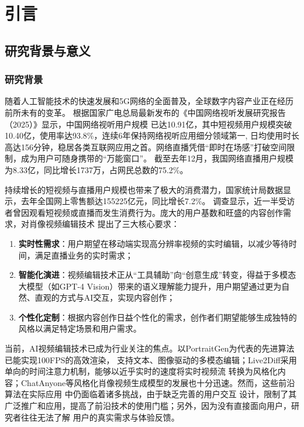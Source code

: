 
\chapter{引言}

\section{研究背景与意义}

\subsection{研究背景}

随着人工智能技术的快速发展和5G网络的全面普及，全球数字内容产业正在经历前所未有的变革。
根据国家广电总局最新发布的《中国网络视听发展研究报告（2025）》显示，中国网络视听用户规模
已达10.91亿，其中短视频用户规模突破10.40亿，使用率达93.8\%，连续6年保持网络视听应用细分领域第一,
日均使用时长高达156分钟，稳居各类互联网应用之首。网络直播凭借“即时在场感”打破空间限制，成为用户可随身携带的“万能窗口”。
截至去年12月，我国网络直播用户规模为8.33亿，同比增长1737万，占网民总数的75.2\%。

持续增长的短视频与直播用户规模也带来了极大的消费潜力，国家统计局数据显示，去年全国网上零售额达155225亿元，同比增长7.2\%。
调查显示，近一半受访者曾因观看短视频或直播而发生消费行为。庞大的用户基数和旺盛的内容创作需求，对肖像视频编辑技术
提出了三大核心要求：
\begin{enumerate}
    \item \textbf{实时性需求}：用户期望在移动端实现高分辨率视频的实时编辑，以减少等待时间，满足直播业务的实时需求；
    \item \textbf{智能化演进}：视频编辑技术正从“工具辅助”向“创意生成”转变，得益于多模态大模型（如GPT-4 Vision）带来的语义理解能力提升，用户期望通过更为自然、直观的方式与AI交互，实现内容创作；
    \item \textbf{个性化定制}：根据内容创作日益个性化的需求，创作者们期望能够生成独特的风格以满足特定场景和用户需求。
\end{enumerate}

当前，AI视频编辑技术已成为行业关注的焦点。以PortraitGen为代表的先进算法已能实现100FPS的高效渲染，
支持文本、图像驱动的多模态编辑；Live2Diff采用单向的时间注意力机制，能够以近乎实时的速度将实时视频流
转换为风格化内容；ChatAnyone等风格化肖像视频生成模型的发展也十分迅速。然而，这些前沿算法在实际应用
中仍面临着诸多挑战，由于缺乏完善的用户交互
设计，限制了其广泛推广和应用，提高了前沿技术的使用门槛；另外，因为没有直接面向用户，研究者往往无法了解
用户的真实需求与体验反馈。

